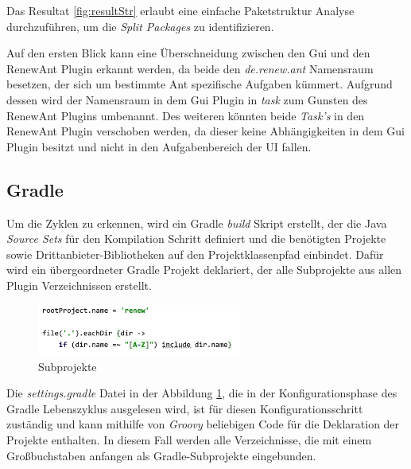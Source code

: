 	Das Resultat \ref{fig:resultStr} erlaubt eine einfache Paketstruktur Analyse durchzuführen, um die \textit{Split Packages} zu identifizieren. 


	Auf den ersten Blick kann eine Überschneidung zwischen den Gui und den RenewAnt Plugin erkannt werden, da beide den \textit{de.renew.ant} Namensraum besetzen, der sich um bestimmte Ant spezifische Aufgaben kümmert. Aufgrund dessen wird der Namensraum in dem Gui Plugin in \textit{task} zum Gunsten des RenewAnt Plugins umbenannt. Des weiteren könnten beide \textit{Task's} in den RenewAnt Plugin verschoben werden, da dieser keine Abhängigkeiten in dem Gui Plugin besitzt und nicht in den Aufgabenbereich der UI fallen. 

\subsection{Gradle}

 	Um die Zyklen zu erkennen, wird ein Gradle \textit{build} Skript erstellt, der die Java \textit{Source Sets} für den Kompilation Schritt definiert und die benötigten Projekte sowie Drittanbieter-Bibliotheken auf den Projektklassenpfad einbindet. Dafür wird ein übergeordneter Gradle Projekt deklariert, der alle Subprojekte aus allen Plugin Verzeichnissen erstellt. 
	\bigbreak
	\begin{figure}[h!]
	  \centering
	  \includegraphics[width=0.6\textwidth]{material/images/settings_gradle.png}
	  \caption{Subprojekte}
	  \label{fig:subprojekte}
	\end{figure}

 	Die \textit{settings.gradle} Datei in der Abbildung \ref{fig:subprojekte}, die in der Konfigurationsphase des Gradle Lebenszyklus ausgelesen wird, ist für diesen Konfigurationsschritt zuständig und kann mithilfe von \textit{Groovy} beliebigen Code für die Deklaration der Projekte enthalten. In diesem Fall werden alle Verzeichnisse, die mit einem Großbuchstaben anfangen als Gradle-Subprojekte eingebunden. 
	\newpage

